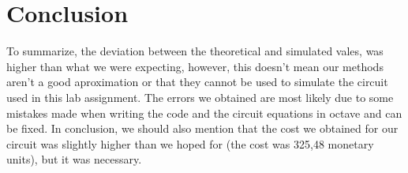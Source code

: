 \section{Conclusion}
\label{sec:conclusion}
To summarize, the deviation between the theoretical and simulated vales, was higher than what we were expecting, however, this doesn't mean our methods aren't a good aproximation or that they cannot be used to simulate the circuit used in this lab assignment. The errors we obtained are most likely due to some mistakes made when writing the code and the circuit equations in octave and can be fixed.
In conclusion, we should also mention that the cost we obtained for our circuit was slightly higher than we hoped for (the cost was 325,48 monetary units), but it was necessary. 